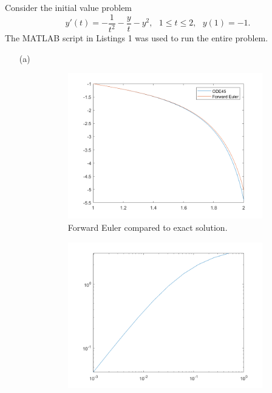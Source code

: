\documentclass[12pt]{report}
\begin{document}
\begin{solution}

    \noindent
    Consider the initial value problem
    \[ 
        y'(t) = - \frac{1}{t^2} - \frac{y}{t} - y^2, ~~~ 1 \leq t \leq 2, ~~~ y(1) = -1.
    \]
    The MATLAB script in Listings 1 was used to run the entire problem.

   


    \begin{enumerate}
        \item [(a)]
        

        \begin{figure}[H]
            \begin{subfigure}[b]{0.5\linewidth}
                \centering
                \includegraphics[width=\linewidth]{images/fe1.png}
                \caption{Forward Euler compared to exact solution.}
                \label{fig1:a}
                \vspace{4ex}
            \end{subfigure}%
            \begin{subfigure}[b]{0.5\linewidth}
                \centering
                \includegraphics[width=\linewidth]{images/fe2.png}

\end{subfigure}
\end{figure}
\end{enumerate}
\end{solution}
\end{document}
